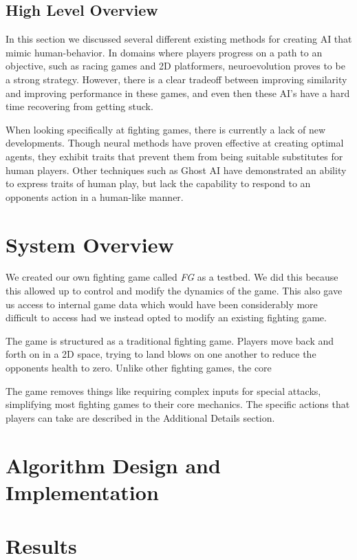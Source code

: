 \documentclass{article}
\begin{document}
\subsection{High Level Overview}
In this section we discussed several different existing methods for creating AI that mimic human-behavior. In domains where players progress on a path to an objective, such as racing games and 2D platformers, neuroevolution proves to be a strong strategy. However, there is a clear tradeoff between improving similarity and improving performance in these games, and even then these AI's have a hard time recovering from getting stuck. 

When looking specifically at fighting games, there is currently a lack of new developments. Though neural methods have proven effective at creating optimal agents, they exhibit traits that prevent them from being suitable substitutes for human players. Other techniques such as Ghost AI have demonstrated an ability to express traits of human play, but lack the capability to respond to an opponents action in a human-like manner.


\section{System Overview}
We created our own fighting game called \textit{FG} as a testbed. We did this because this allowed up to control and modify the dynamics of the game. This also gave us access to internal game data which would have been considerably more difficult to access had we instead opted to modify an existing fighting game. 

The game is structured as a traditional fighting game. Players move back and forth on in a 2D space, trying to land blows on one another to reduce the opponents health to zero. Unlike other fighting games, the core 

The game removes things like requiring complex inputs for special attacks, simplifying most fighting games to their core mechanics. The specific actions that players can take are described in the Additional Details section.

\section{Algorithm Design and Implementation}

\section{Results}
\end{document}
